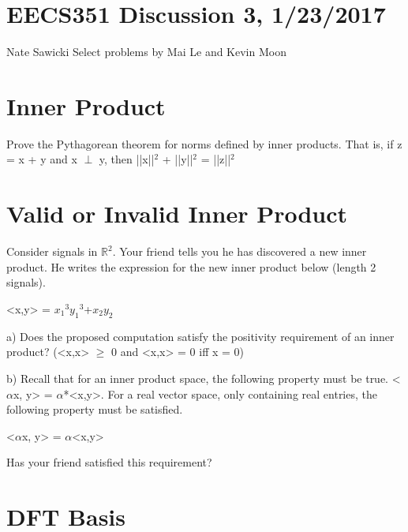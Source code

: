 \documentclass[11pt]{article}
\begin{document}
\section*{EECS351 Discussion 3, 1/23/2017}
Nate Sawicki \newline
Select problems by Mai Le and Kevin Moon

\section{Inner Product}
Prove the Pythagorean theorem for norms defined by inner products. That is, if z = x + y and \newline
x $\perp$ y, then ||x||$^2$ + ||y||$^2$ = ||z||$^2$

\section{Valid or Invalid Inner Product}
Consider signals in $\mathbb{R}^2$. Your friend tells you he has discovered a new inner product. He writes the expression for the new inner product below (length 2 signals).

\vspace{2mm}
\begin{center}
<x,y> = $x_1$$^3$$y_1$$^3$+$x_2$$y_2$
\end{center}
\vspace{2mm}

a)\newline
Does the proposed computation satisfy the positivity requirement of an inner product? \newline(<x,x> $\geq$ 0 and <x,x> = 0 iff x = 0)\newline

b)\newline
Recall that for an inner product space, the following property must be true. <$\alpha$x, y> = $\alpha$*<x,y>. For a real vector space,  only containing real entries, the following property must be satisfied.
\vspace{2mm}
\begin{center}
<$\alpha$x, y> = $\alpha$<x,y>
\end{center}
\vspace{2mm}
Has your friend satisfied this requirement?
\vspace{2mm}


\section{DFT Basis}
\end{document}
